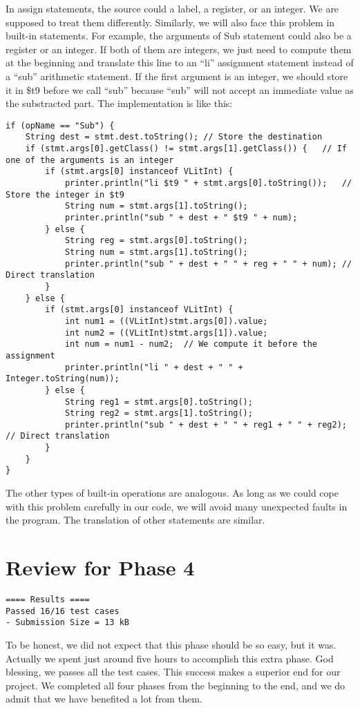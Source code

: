 \documentclass[letterpaper, 14pt]{article}
\begin{document}
In assign statements, the source could a label, a register, or an integer. We are supposed to treat them differently. Similarly, we will also face this problem in built-in statements. For example, the arguments of \textsf{Sub} statement could also be a register or an integer. If both of them are integers, we just need to compute them at the beginning and translate this line to an ``li'' assignment statement instead of a ``sub'' arithmetic statement. If the first argument is an integer, we should store it in \$t9 before we call ``sub'' because ``sub'' will not accept an immediate value as the substracted part. The implementation is like this:
\begin{lstlisting}
if (opName == "Sub") {
	String dest = stmt.dest.toString();	// Store the destination
	if (stmt.args[0].getClass() != stmt.args[1].getClass()) {	// If one of the arguments is an integer
		if (stmt.args[0] instanceof VLitInt) {
			printer.println("li $t9 " + stmt.args[0].toString());	// Store the integer in $t9
			String num = stmt.args[1].toString();
			printer.println("sub " + dest + " $t9 " + num);
		} else {
			String reg = stmt.args[0].toString();
			String num = stmt.args[1].toString();
			printer.println("sub " + dest + " " + reg + " " + num);	// Direct translation
		}
	} else {
		if (stmt.args[0] instanceof VLitInt) {
			int num1 = ((VLitInt)stmt.args[0]).value;
			int num2 = ((VLitInt)stmt.args[1]).value;
			int num = num1 - num2;	// We compute it before the assignment
			printer.println("li " + dest + " " + Integer.toString(num));
		} else {
			String reg1 = stmt.args[0].toString();
			String reg2 = stmt.args[1].toString();
			printer.println("sub " + dest + " " + reg1 + " " + reg2);	// Direct translation
		}
	}
}
\end{lstlisting}

The other types of built-in operations are analogous. As long as we could cope with this problem carefully in our code, we will avoid many unexpected faults in the program. The translation of other statements are similar. 

\section{Review for Phase 4}

\begin{lstlisting}
==== Results ====
Passed 16/16 test cases
- Submission Size = 13 kB
\end{lstlisting}

To be honest, we did not expect that this phase should be so easy, but it was. Actually we spent just around five hours to accomplish this extra phase. God blessing, we passes all the test cases. This success makes a superior end for our project. We completed all four phases from the beginning to the end, and we do admit that we have benefited a lot from them. 
\end{document}
